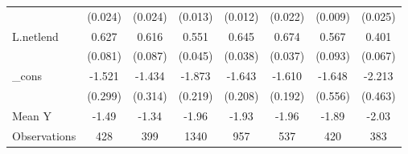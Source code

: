 {\begin{tabular}{l*{7}{c}}
            &     (0.024)         &     (0.024)         &     (0.013)         &     (0.012)         &     (0.022)         &     (0.009)         &     (0.025)         \\
\addlinespace
L.netlend   &       0.627\sym{***}&       0.616\sym{***}&       0.551\sym{***}&       0.645\sym{***}&       0.674\sym{***}&       0.567\sym{***}&       0.401\sym{***}\\
            &     (0.081)         &     (0.087)         &     (0.045)         &     (0.038)         &     (0.037)         &     (0.093)         &     (0.067)         \\
\addlinespace
\_cons      &      -1.521\sym{***}&      -1.434\sym{***}&      -1.873\sym{***}&      -1.643\sym{***}&      -1.610\sym{***}&      -1.648\sym{***}&      -2.213\sym{***}\\
            &     (0.299)         &     (0.314)         &     (0.219)         &     (0.208)         &     (0.192)         &     (0.556)         &     (0.463)         \\
\midrule
Mean Y      &       -1.49         &       -1.34         &       -1.96         &       -1.93         &       -1.96         &       -1.89         &       -2.03         \\
Observations&         428         &         399         &        1340         &         957         &         537         &         420         &         383         \\
\bottomrule
\end{tabular}
}
